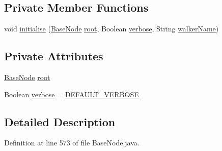 \subsection*{Private Member Functions}
\begin{DoxyCompactItemize}
\item 
void \hyperlink{classit_1_1emarolab_1_1cagg_1_1core_1_1BaseNode_1_1TreeVisitor_a2329c6eb38dda7998c9ed37be7f4ea87}{initialise} (\hyperlink{classit_1_1emarolab_1_1cagg_1_1core_1_1BaseNode}{Base\-Node} \hyperlink{classit_1_1emarolab_1_1cagg_1_1core_1_1BaseNode_1_1TreeVisitor_ac31e11edac71abb866fd7d113a2bb017}{root}, Boolean \hyperlink{classit_1_1emarolab_1_1cagg_1_1core_1_1BaseNode_1_1TreeVisitor_a08821e56497abdbac48f874f8946b335}{verbose}, String \hyperlink{classit_1_1emarolab_1_1cagg_1_1core_1_1BaseNode_1_1TreeVisitor_aa7178eb73b988619412baf1d4f97b703}{walker\-Name})
\end{DoxyCompactItemize}
\subsection*{Private Attributes}
\begin{DoxyCompactItemize}
\item 
\hyperlink{classit_1_1emarolab_1_1cagg_1_1core_1_1BaseNode}{Base\-Node} \hyperlink{classit_1_1emarolab_1_1cagg_1_1core_1_1BaseNode_1_1TreeVisitor_ac31e11edac71abb866fd7d113a2bb017}{root}
\item 
Boolean \hyperlink{classit_1_1emarolab_1_1cagg_1_1core_1_1BaseNode_1_1TreeVisitor_a08821e56497abdbac48f874f8946b335}{verbose} = \hyperlink{classit_1_1emarolab_1_1cagg_1_1core_1_1BaseNode_a800cf0002fa8eb5d2e1a1efc798e9d3d}{D\-E\-F\-A\-U\-L\-T\-\_\-\-V\-E\-R\-B\-O\-S\-E}
\end{DoxyCompactItemize}


\subsection{Detailed Description}


Definition at line 573 of file Base\-Node.\-java.



